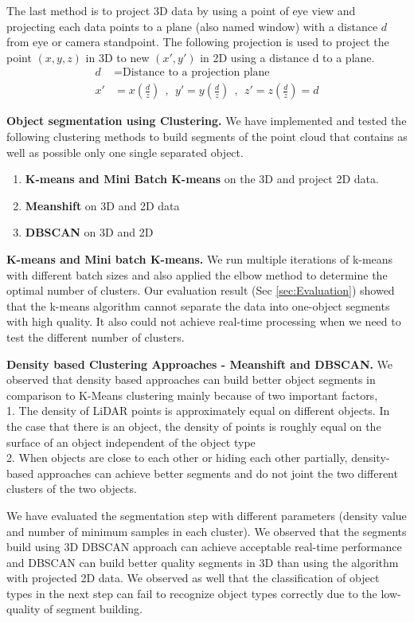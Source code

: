 The last method is to project 3D data by using a point of eye view and projecting each data points
to a plane (also named window) with a distance $d$ from eye or camera standpoint.
The following projection is used to project the point $(x,y,z)$ in 3D to new $(x',  y')$ in 2D
using a distance d to a plane.
\begin{align*}
d  & = \text{Distance to a projection plane} \\
x' & =  x (\frac{d}{z}) \ \  , \ \  y' =  y (\frac{d}{z}) \ \  , \ \  z'=  z (\frac{d}{z}) = d
\end{align*}

\textbf{Object segmentation using Clustering.}
We have implemented and tested the following clustering methods to build segments of the point cloud
that contains as well as possible only one single separated object.

\begin{enumerate}
  \item \textbf{K-means and Mini Batch K-means} on the 3D and project 2D data.
  \item \textbf{Meanshift} on 3D and 2D data
  \item \textbf{DBSCAN} on 3D and 2D
\end{enumerate}

\textbf{K-means and Mini batch K-means.}
We run multiple iterations of k-means with
different batch sizes and also applied the elbow method to determine the optimal number of clusters.
Our evaluation result (Sec \ref{sec:Evaluation}) showed that the k-means algorithm cannot separate the data into one-object segments with high quality.
It also could not achieve real-time processing when we need to test the different number of clusters.

\textbf{Density based Clustering Approaches - Meanshift and DBSCAN.}
We observed that density based approaches can build better object segments in comparison to K-Means clustering mainly because of two important factors,\\
1. The density of LiDAR points is approximately equal on different objects.
In the case that there is an object, the density of points is roughly equal on the surface of
an object independent of the object type\\
2. When objects are close to each other or hiding each
other partially, density-based approaches can achieve better segments and do not joint the two different clusters of the two objects.

We have evaluated the segmentation step with different parameters (density value and number of minimum samples in each cluster).
We observed that the segments build using 3D DBSCAN approach can achieve acceptable
real-time performance and DBSCAN can build better quality segments in 3D than using the algorithm
with projected 2D data. We observed as well that the classification of object types in the
next step can fail to recognize object types correctly due to the low-quality of segment
building.



